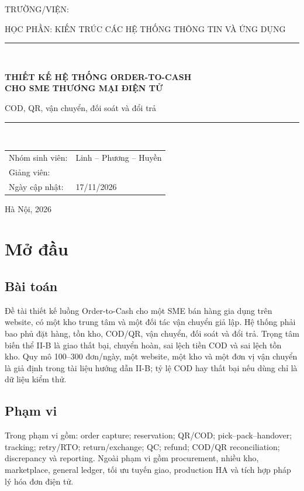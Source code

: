\documentclass[12pt,a4paper]{report}
\newcommand{\HRule}{\rule{\linewidth}{0.5mm}}
\begin{document}
\begin{titlepage}
\centering
{\large TRƯỜNG/VIỆN: \underline{\hspace{8cm}}\par}
\vspace{1.2cm}
{\large HỌC PHẦN: KIẾN TRÚC CÁC HỆ THỐNG THÔNG TIN VÀ ỨNG DỤNG\par}
\vspace{1.5cm}
\HRule\\[0.5cm]
{\Huge\bfseries THIẾT KẾ HỆ THỐNG ORDER-TO-CASH\\CHO SME THƯƠNG MẠI ĐIỆN TỬ\par}
\vspace{0.3cm}
{\Large COD, QR, vận chuyển, đối soát và đổi trả\par}
\HRule\\[1.5cm]
\begin{tabular}{ll}
Nhóm sinh viên: & Linh -- Phương -- Huyền\\
Giảng viên: & \underline{\hspace{7cm}}\\
Ngày cập nhật: & 17/11/2026
\end{tabular}
\vfill
{\large Hà Nội, 2026\par}
\end{titlepage}

\tableofcontents
\listoftables
\clearpage
{}

\chapter{Mở đầu}

\section{Bài toán}
Đề tài thiết kế luồng Order-to-Cash cho một SME bán hàng gia dụng trên website, có một kho trung tâm và một đối tác vận chuyển giả lập. Hệ thống phải bao phủ đặt hàng, tồn kho, COD/QR, vận chuyển, đối soát và đổi trả. Trọng tâm biến thể II-B là giao thất bại, chuyển hoàn, sai lệch tiền COD và sai lệch tồn kho. Quy mô 100--300 đơn/ngày, một website, một kho và một đơn vị vận chuyển là giả định trong tài liệu hướng dẫn II-B; tỷ lệ COD hay thất bại nếu dùng chỉ là dữ liệu kiểm thử.

\section{Phạm vi}
Trong phạm vi gồm: order capture; reservation; QR/COD; pick--pack--handover; tracking; retry/RTO; return/exchange; QC; refund; COD/QR reconciliation; discrepancy và reporting. Ngoài phạm vi gồm procurement, nhiều kho, marketplace, general ledger, tối ưu tuyến giao, production HA và tích hợp pháp lý hóa đơn điện tử.
\end{document}

